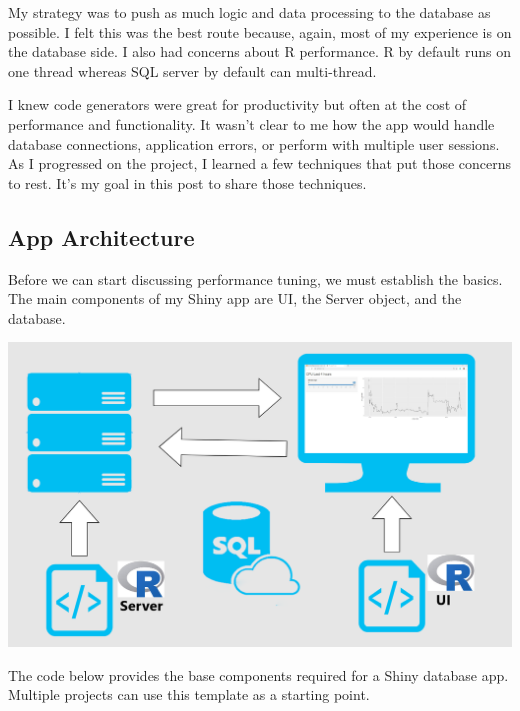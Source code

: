 \documentclass[]{article}
\begin{document}
My strategy was to push as much logic and data processing to the
database as possible. I felt this was the best route because, again,
most of my experience is on the database side. I also had concerns about
R performance. R by default runs on one thread whereas SQL server by
default can multi-thread.

I knew code generators were great for productivity but often at the cost
of performance and functionality. It wasn't clear to me how the app
would handle database connections, application errors, or perform with
multiple user sessions. As I progressed on the project, I learned a few
techniques that put those concerns to rest. It's my goal in this post to
share those techniques.

\hypertarget{app-architecture}{%
\subsection{App Architecture}\label{app-architecture}}

Before we can start discussing performance tuning, we must establish the
basics. The main components of my Shiny app are UI, the Server object,
and the database.

\includegraphics{./Images/ShinyArc.png}

The code below provides the base components required for a Shiny
database app. Multiple projects can use this template as a starting
point.
\end{document}
